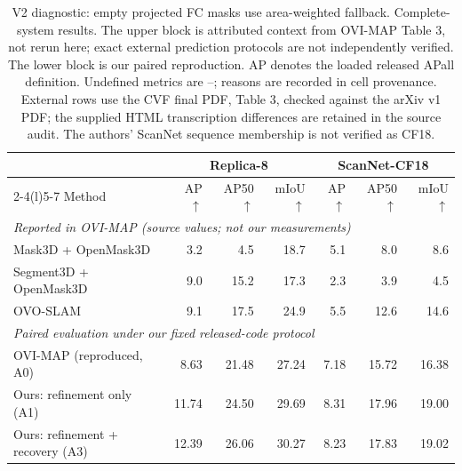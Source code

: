 \begin{table}[!ht]
\centering
\caption{V2 diagnostic: empty projected FC masks use area-weighted fallback. Complete-system results. The upper block is attributed context from OVI-MAP Table 3, not rerun here; exact external prediction protocols are not independently verified. The lower block is our paired reproduction. AP denotes the loaded released APall definition. Undefined metrics are --; reasons are recorded in cell provenance. External rows use the CVF final PDF, Table 3, checked against the arXiv v1 PDF; the supplied HTML transcription differences are retained in the source audit. The authors' ScanNet sequence membership is not verified as CF18.}
\label{tab:main}
\fontsize{9}{10.5}\selectfont
\setlength{\tabcolsep}{5pt}
\begin{tabular*}{\textwidth}{@{\extracolsep{\fill}}lrrrrrr@{}}
\toprule
& \multicolumn{3}{c}{Replica-8} & \multicolumn{3}{c}{ScanNet-CF18} \\
\cmidrule(lr){2-4}\cmidrule(l){5-7}
Method & AP$\uparrow$ & AP50$\uparrow$ & mIoU$\uparrow$ & AP$\uparrow$ & AP50$\uparrow$ & mIoU$\uparrow$ \\
\midrule
\multicolumn{7}{l}{\emph{Reported in OVI-MAP (source values; not our measurements)}}\\
Mask3D + OpenMask3D & 3.2 & 4.5 & 18.7 & 5.1 & 8.0 & 8.6 \\
Segment3D + OpenMask3D & 9.0 & 15.2 & 17.3 & 2.3 & 3.9 & 4.5 \\
OVO-SLAM & 9.1 & 17.5 & 24.9 & 5.5 & 12.6 & 14.6 \\
\midrule
\multicolumn{7}{l}{\emph{Paired evaluation under our fixed released-code protocol}}\\
OVI-MAP (reproduced, A0) & 8.63 & 21.48 & 27.24 & 7.18 & 15.72 & 16.38 \\
Ours: refinement only (A1) & 11.74 & 24.50 & 29.69 & 8.31 & 17.96 & 19.00 \\
Ours: refinement + recovery (A3) & 12.39 & 26.06 & 30.27 & 8.23 & 17.83 & 19.02 \\
\bottomrule
\end{tabular*}
\end{table}
